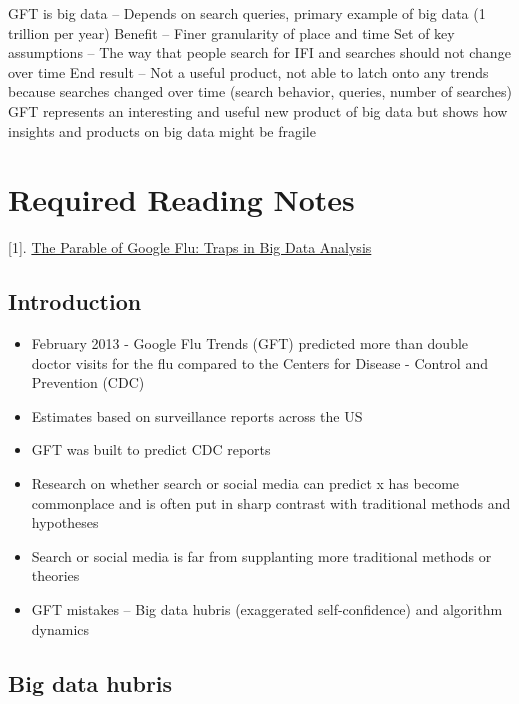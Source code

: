 \documentclass[
]{book}
\providecommand{\tightlist}{%
  \setlength{\itemsep}{0pt}\setlength{\parskip}{0pt}}
\begin{document}
GFT is big data -- Depends on search queries, primary example of big data (1 trillion per year)
Benefit -- Finer granularity of place and time
Set of key assumptions -- The way that people search for IFI and searches should not change over time
End result -- Not a useful product, not able to latch onto any trends because searches changed over time (search behavior, queries, number of searches)
GFT represents an interesting and useful new product of big data but shows how insights and products on big data might be fragile

\section{Required Reading Notes}\label{required-reading-notes}

{[}1{]}. \href{https://gking.harvard.edu/files/gking/files/0314policyforumff.pdf}{The Parable of Google Flu: Traps in Big Data Analysis}

\subsection{Introduction}\label{introduction}

\begin{itemize}
\tightlist
\item
  February 2013 - Google Flu Trends (GFT) predicted more than double doctor visits for the flu compared to the Centers for Disease - Control and Prevention (CDC)
\item
  Estimates based on surveillance reports across the US
\item
  GFT was built to predict CDC reports
\item
  Research on whether search or social media can predict x has become commonplace and is often put in sharp contrast with traditional methods and hypotheses
\item
  Search or social media is far from supplanting more traditional methods or theories
\item
  GFT mistakes -- Big data hubris (exaggerated self-confidence) and algorithm dynamics
\end{itemize}

\subsection{Big data hubris}\label{big-data-hubris}
\end{document}
